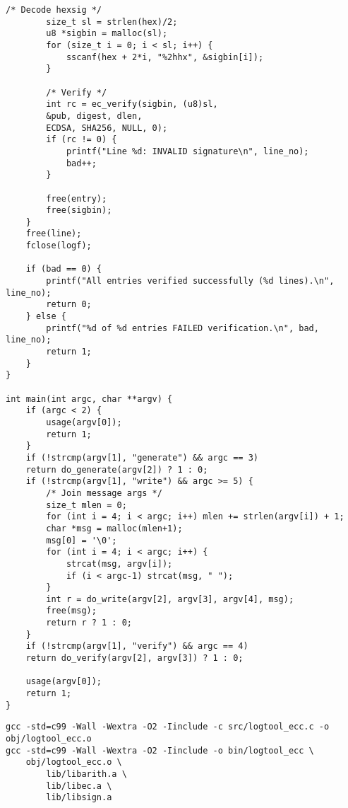 \begin{lstlisting}[style=cstyle]
		/* Decode hexsig */
		size_t sl = strlen(hex)/2;
		u8 *sigbin = malloc(sl);
		for (size_t i = 0; i < sl; i++) {
			sscanf(hex + 2*i, "%2hhx", &sigbin[i]);
		}
		
		/* Verify */
		int rc = ec_verify(sigbin, (u8)sl,
		&pub, digest, dlen,
		ECDSA, SHA256, NULL, 0);
		if (rc != 0) {
			printf("Line %d: INVALID signature\n", line_no);
			bad++;
		}
		
		free(entry);
		free(sigbin);
	}
	free(line);
	fclose(logf);
	
	if (bad == 0) {
		printf("All entries verified successfully (%d lines).\n", line_no);
		return 0;
	} else {
		printf("%d of %d entries FAILED verification.\n", bad, line_no);
		return 1;
	}
}

int main(int argc, char **argv) {
	if (argc < 2) {
		usage(argv[0]);
		return 1;
	}
	if (!strcmp(argv[1], "generate") && argc == 3)
	return do_generate(argv[2]) ? 1 : 0;
	if (!strcmp(argv[1], "write") && argc >= 5) {
		/* Join message args */
		size_t mlen = 0;
		for (int i = 4; i < argc; i++) mlen += strlen(argv[i]) + 1;
		char *msg = malloc(mlen+1);
		msg[0] = '\0';
		for (int i = 4; i < argc; i++) {
			strcat(msg, argv[i]);
			if (i < argc-1) strcat(msg, " ");
		}
		int r = do_write(argv[2], argv[3], argv[4], msg);
		free(msg);
		return r ? 1 : 0;
	}
	if (!strcmp(argv[1], "verify") && argc == 4)
	return do_verify(argv[2], argv[3]) ? 1 : 0;
	
	usage(argv[0]);
	return 1;
}
\end{lstlisting}
\begin{lstlisting}[numbers=none]
gcc -std=c99 -Wall -Wextra -O2 -Iinclude -c src/logtool_ecc.c -o obj/logtool_ecc.o
gcc -std=c99 -Wall -Wextra -O2 -Iinclude -o bin/logtool_ecc \
	obj/logtool_ecc.o \
		lib/libarith.a \
		lib/libec.a \
		lib/libsign.a
\end{lstlisting}

\newpage
